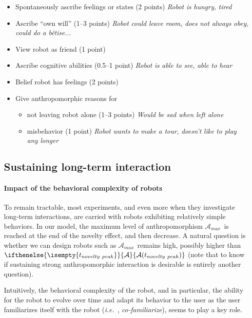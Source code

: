 \documentclass{frontiersSCNS} %
\newcommand{\ie}{{\textit{i.e.~}}}
\newcommand{\ant}[1][]{%
      \ifthenelse{\isempty{#1}}%
        {\mathcal{A}}
        {\mathcal{A}(#1)}
}
\newcommand{\AntMax}{{$\mathcal{A}_{max}$~}}
\begin{document}
\begin{itemize}
    \item Spontaneously ascribe feelings or states (2 points) {\it Robot is
        hungry, tired}
    \item Ascribe ``own will'' (1--3 points) {\it Robot could leave room, does not
        always obey, could do a b\^{e}tise...}
    \item View robot as friend (1 point)
    \item Ascribe cognitive abilities (0.5--1 point) {\it Robot is able to see,
        able to hear}
    \item Belief robot has feelings (2 points)
    \item Give anthropomorphic reasons for
        \begin{itemize}
            \item not leaving robot alone (1--3 points) {\it Would be sad when
                left alone}
            \item misbehavior (1 point) {\it Robot wants to make a tour, doesn't
                like to play any longer}
        \end{itemize}
\end{itemize}

\subsection{Sustaining long-term interaction}

\paragraph{Impact of the behavioral complexity of robots}

To remain tractable, most experiments, and even more when they investigate
long-term interactions, are carried with robots exhibiting relatively simple
behaviors. In our model, the maximum level of anthropomorphism \AntMax is
reached at the end of the novelty effect, and then decrease. A natural question
is whether we can design robots such as \AntMax remains high, possibly higher
than $\ant[t_{novelty~peak}]$ (note that to know if sustaining strong
anthropomorphic interaction is desirable is entirely another question).

Intuitively, the behavioral complexity of the robot, and in particular, the ability
for the robot to evolve over time and adapt its behavior to the user as the user
familiarizes itself with the robot (\ie, \emph{co-familiarize}), seems to play a
key role.
\end{document}
